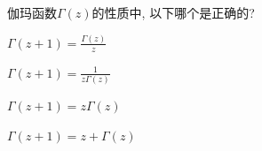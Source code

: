 \documentclass{njustexam}
\begin{document}

    
    







\begin{problem}

伽玛函数$\Gamma(z)$的性质中, 以下哪个是正确的? 
\begin{abcd}
\item $\Gamma(z+1) = \frac{\Gamma(z)}{z}$

\item $\Gamma(z+1) = \frac{1}{z\Gamma(z)}$
\item $\Gamma(z+1) = z\Gamma(z)$
\item $\Gamma(z+1) = z+\Gamma(z)$
\end{abcd}
\end{problem}
\end{document}
